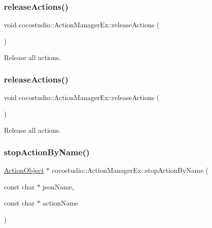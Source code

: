 \subsubsection{\texorpdfstring{release\+Actions()}{releaseActions()}\hspace{0.1cm}{\footnotesize\ttfamily [1/2]}}
{\footnotesize\ttfamily void cocostudio\+::\+Action\+Manager\+Ex\+::release\+Actions (\begin{DoxyParamCaption}{ }\end{DoxyParamCaption})}

Release all actions. \mbox{\label{classcocostudio_1_1ActionManagerEx_a3e4f9d42f9530eb7588d393843de0f3d}} 
\subsubsection{\texorpdfstring{release\+Actions()}{releaseActions()}\hspace{0.1cm}{\footnotesize\ttfamily [2/2]}}
{\footnotesize\ttfamily void cocostudio\+::\+Action\+Manager\+Ex\+::release\+Actions (\begin{DoxyParamCaption}{ }\end{DoxyParamCaption})}

Release all actions. \mbox{\label{classcocostudio_1_1ActionManagerEx_ad69b7ac6c5a1ba69ca734967b2b5dfe3}} 
\subsubsection{\texorpdfstring{stop\+Action\+By\+Name()}{stopActionByName()}\hspace{0.1cm}{\footnotesize\ttfamily [1/2]}}
{\footnotesize\ttfamily \hyperlink{classcocostudio_1_1ActionObject}{Action\+Object} $\ast$ cocostudio\+::\+Action\+Manager\+Ex\+::stop\+Action\+By\+Name (\begin{DoxyParamCaption}\item[{const char $\ast$}]{json\+Name,  }\item[{const char $\ast$}]{action\+Name }\end{DoxyParamCaption})}

